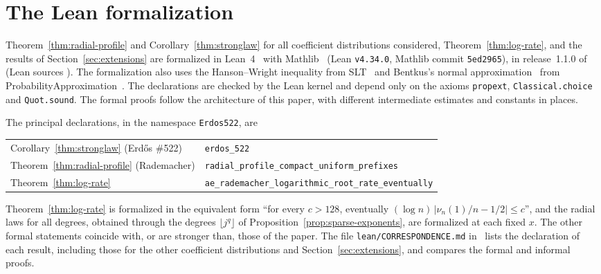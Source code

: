 \section{The Lean formalization}\label{sec:formalization}
Theorem~\ref{thm:radial-profile} and Corollary~\ref{thm:stronglaw} for all
coefficient distributions considered, Theorem~\ref{thm:log-rate}, and the
results of Section~\ref{sec:extensions} are formalized in
Lean~4~\cite{LeanFour2021} with Mathlib~\cite{Mathlib2020} (Lean
\texttt{v4.34.0}, Mathlib commit \texttt{5ed2965}), in release~1.1.0
of~\cite{FormalCompanion2026} (Lean sources ).
The formalization also uses the Hanson--Wright inequality from
SLT~\cite{SLTLean} and Bentkus's normal approximation~\cite{Bentkus2005}
from ProbabilityApproximation~\cite{ProbabilityApproximationLean}.
The declarations are
checked by the Lean kernel and depend only on the axioms
\texttt{propext}, \texttt{Classical.choice} and \texttt{Quot.sound}. The
formal proofs follow the architecture of this paper, with different
intermediate estimates and constants in places.

The principal declarations, in the namespace \texttt{Erdos522}, are
\begin{center}
\small
\begin{tabular}{@{}ll@{}}
Corollary~\ref{thm:stronglaw} (Erd\H{o}s \#522) & \texttt{erdos\_522} \\
Theorem~\ref{thm:radial-profile} (Rademacher) & \texttt{radial\_profile\_compact\_uniform\_prefixes} \\
Theorem~\ref{thm:log-rate} & \texttt{ae\_rademacher\_logarithmic\_root\_rate\_eventually}
\end{tabular}
\end{center}
Theorem~\ref{thm:log-rate} is formalized in the equivalent form ``for every
$c > 128$, eventually $(\log n)\,|\nu_n(1)/n - 1/2| \le c$'', and
the radial laws for all degrees, obtained through the degrees
$\lfloor j^q\rfloor$ of Proposition~\ref{prop:sparse-exponents}, are
formalized at each fixed $x$. The other formal statements coincide with,
or are stronger than, those of the paper. The file
\texttt{lean/CORRESPONDENCE.md} in~\cite{FormalCompanion2026} lists the
declaration of each result, including those for the other coefficient distributions and
Section~\ref{sec:extensions}, and compares the formal and informal proofs.
